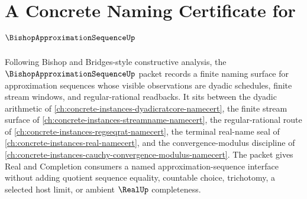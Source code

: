 \chapter{A Concrete Naming Certificate for $\BishopApproximationSequenceUp$}
\label{ch:concrete-instances-bishop-approximation-sequence-namecert}

Following Bishop and Bridges-style constructive analysis, the $\BishopApproximationSequenceUp$ packet records a finite naming surface for approximation sequences whose visible observations are dyadic schedules, finite stream windows, and regular-rational readbacks. It sits between the dyadic arithmetic of \autoref{ch:concrete-instances-dyadicratcore-namecert}, the finite stream surface of \autoref{ch:concrete-instances-streamname-namecert}, the regular-rational route of \autoref{ch:concrete-instances-regseqrat-namecert}, the terminal real-name seal of \autoref{ch:concrete-instances-real-namecert}, and the convergence-modulus discipline of \autoref{ch:concrete-instances-cauchy-convergence-modulus-namecert}. The packet gives Real and Completion consumers a named approximation-sequence interface without adding quotient sequence equality, countable choice, trichotomy, a selected host limit, or ambient $\RealUp$ completeness.

